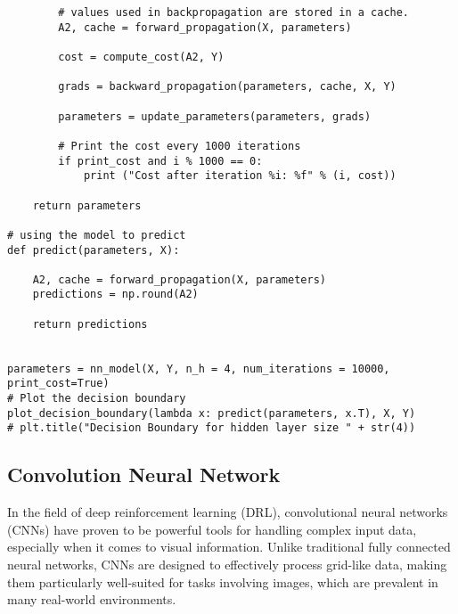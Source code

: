 \documentclass{article}
\begin{document}
\begin{lstlisting}
        # values used in backpropagation are stored in a cache.
        A2, cache = forward_propagation(X, parameters)

        cost = compute_cost(A2, Y)

        grads = backward_propagation(parameters, cache, X, Y)

        parameters = update_parameters(parameters, grads)

        # Print the cost every 1000 iterations
        if print_cost and i % 1000 == 0:
            print ("Cost after iteration %i: %f" % (i, cost))

    return parameters

# using the model to predict
def predict(parameters, X):

    A2, cache = forward_propagation(X, parameters)
    predictions = np.round(A2)

    return predictions


parameters = nn_model(X, Y, n_h = 4, num_iterations = 10000, print_cost=True)
# Plot the decision boundary
plot_decision_boundary(lambda x: predict(parameters, x.T), X, Y)
# plt.title("Decision Boundary for hidden layer size " + str(4))

\end{lstlisting}

\begin{comment}
\begin{figure}[htbp]
    \centering
    \begin{minipage}[t]{0.48\textwidth}
    \centering
    \texttt{[image: figure/planar-dataset]}
    \caption{Planar Dataset Visualization}
    \end{minipage}
    \begin{minipage}[t]{0.48\textwidth}
    \centering
    \texttt{[image: figure/nn-classfication-result]}
    \caption{Neural Network Classification Result}
    \end{minipage}
    \end{figure}
\end{comment}


    \newpage
	\subsection{Convolution Neural Network}

    In the field of deep reinforcement learning (DRL), convolutional neural networks (CNNs) have proven to be powerful tools for handling complex input data, especially when it comes to visual information. Unlike traditional fully connected neural networks, CNNs are designed to effectively process grid-like data, making them particularly well-suited for tasks involving images, which are prevalent in many real-world environments.
\end{document}

